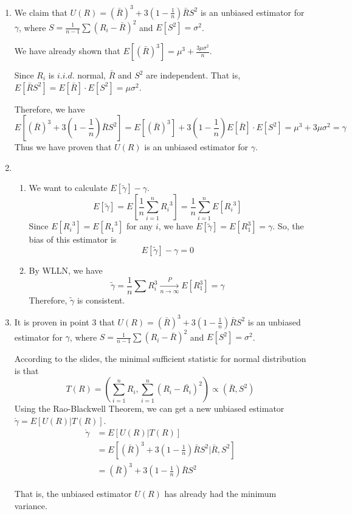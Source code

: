 \documentclass[11pt]{article}
\begin{document}
\begin{enumerate}
    \item
    We claim that $U(R) = (\bar{R})^3 + 3(1-\frac{1}{n})\bar{R}S^2$ is an unbiased estimator for $\gamma$, where $S=\frac{1}{n-1}\sum (R_i-\bar{R})^2$ and $E[S^2]=\sigma^2$. \par
    We have already shown that $E[(\bar{R})^3]=\mu^3+\frac{3\mu\sigma^2}{n}$. \par
    Since $R_i$ is $i.i.d.$ normal, $\bar{R}$ and $S^2$ are independent. That is, $E[\bar{R}S^2]=E[\bar{R}]\cdot E[S^2]=\mu\sigma^2$. \par
    Therefore, we have  
    $$E[(\bar{R})^3 + 3(1-\frac{1}{n})\bar{R}S^2] = E[(\bar{R})^3] + 3(1-\frac{1}{n})E[\bar{R}]\cdot E[S^2] 
    = \mu^3 + 3\mu\sigma^2 = \gamma$$
    Thus we have proven that $U(R)$ is an unbiased estimator for $\gamma$.
    
    
    \item
    \begin{enumerate}
        \item We want to calculate $E[\tilde{\gamma}]-\gamma$. \[E[\tilde{\gamma}]=E[\frac{1}{n}\sum_{i=1}^{n}{R_i}^3]=\frac{1}{n}\sum_{i=1}^{n}E[{R_i}^3]\]
        Since $E[{R_i}^3]=E[{R_1}^3]$ for any $i$, we have $E[\tilde{\gamma}]=E[R_1^3]=\gamma$.
        So, the bias of this estimator is 
        \[E[\tilde{\gamma}]-\gamma=0\]
        \item
        By WLLN, we have 
        $$\tilde{\gamma}=\frac{1}{n}\sum R_i^3 \xrightarrow[n\rightarrow\infty]{P} E[R_1^3] 
        = \gamma$$
        Therefore, $\tilde{\gamma}$ is consistent. 
    \end{enumerate}
    
    \item
    It is proven in point 3 that $U(R) = (\bar{R})^3 + 3(1-\frac{1}{n})\bar{R}S^2$ is an unbiased estimator for $\gamma$, where $S=\frac{1}{n-1}\sum (R_i-\bar{R})^2$ and $E[S^2]=\sigma^2$. \par
    \vspace{0.4cm}
    According to the slides, the minimal sufficient statistic for normal distribution is that \[T(R)=\left(\sum_{i=1}^{n}R_i, \sum_{i=1}^{n}({R_i}-\bar{R_i})^2 \right)\propto(\bar{R},S^2)\] 
   \vspace{0.4cm}
    Using the Rao-Blackwell Theorem, we can get a new unbiased estimator $\mathring{\gamma}=E[U(R)|T(R)]$.
    \begin{equation*}
    \begin{split}
    \mathring{\gamma} &=E[U(R)|T(R)] \\
    &=E\left[(\bar{R})^3 + 3(1-\frac{1}{n})\bar{R}S^2|\bar{R},S^2 \right] \\
    &=(\bar{R})^3 + 3(1-\frac{1}{n})\bar{R}S^2
    \end{split}
    \end{equation*}
    
    That is, the unbiased estimator $U(R)$ has already had the minimum variance.
    

\end{enumerate}
\end{document}
